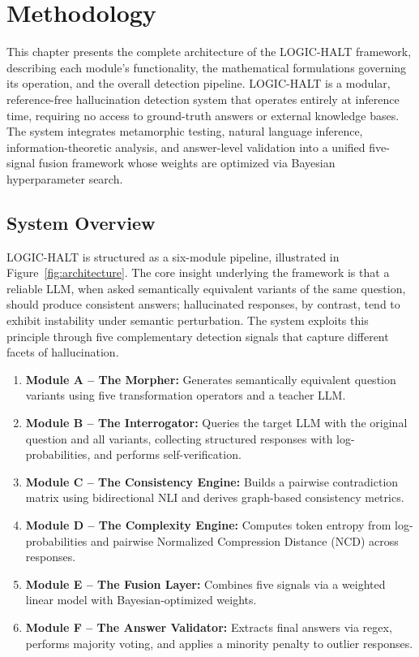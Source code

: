\chapter{Methodology}

This chapter presents the complete architecture of the LOGIC-HALT framework, describing each module's functionality, the mathematical formulations governing its operation, and the overall detection pipeline. LOGIC-HALT is a modular, reference-free hallucination detection system that operates entirely at inference time, requiring no access to ground-truth answers or external knowledge bases. The system integrates metamorphic testing, natural language inference, information-theoretic analysis, and answer-level validation into a unified five-signal fusion framework whose weights are optimized via Bayesian hyperparameter search.

\section{System Overview}

LOGIC-HALT is structured as a six-module pipeline, illustrated in Figure~\ref{fig:architecture}. The core insight underlying the framework is that a reliable LLM, when asked semantically equivalent variants of the same question, should produce consistent answers; hallucinated responses, by contrast, tend to exhibit instability under semantic perturbation. The system exploits this principle through five complementary detection signals that capture different facets of hallucination.

\begin{enumerate}
    \item \textbf{Module A -- The Morpher:} Generates semantically equivalent question variants using five transformation operators and a teacher LLM.
    \item \textbf{Module B -- The Interrogator:} Queries the target LLM with the original question and all variants, collecting structured responses with log-probabilities, and performs self-verification.
    \item \textbf{Module C -- The Consistency Engine:} Builds a pairwise contradiction matrix using bidirectional NLI and derives graph-based consistency metrics.
    \item \textbf{Module D -- The Complexity Engine:} Computes token entropy from log-probabilities and pairwise Normalized Compression Distance (NCD) across responses.
    \item \textbf{Module E -- The Fusion Layer:} Combines five signals via a weighted linear model with Bayesian-optimized weights.
    \item \textbf{Module F -- The Answer Validator:} Extracts final answers via regex, performs majority voting, and applies a minority penalty to outlier responses.
\end{enumerate}

